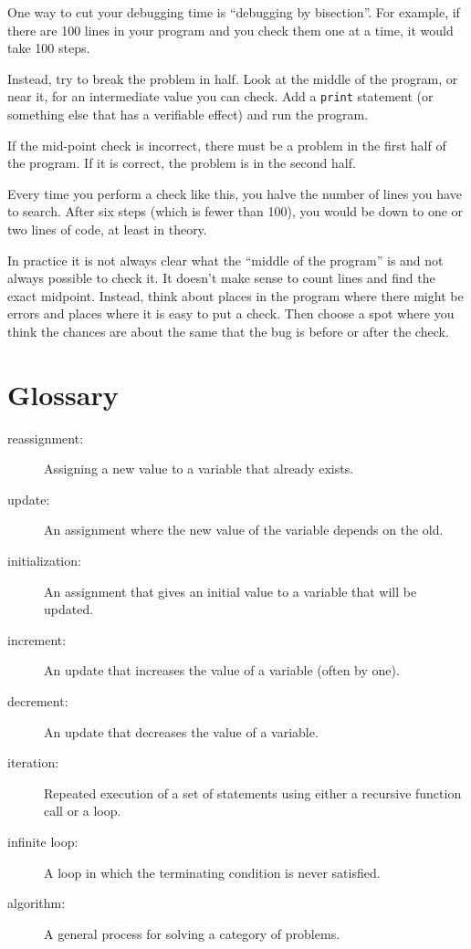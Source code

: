 \documentclass[10pt]{book}
\begin{document}
One way to cut your debugging time is ``debugging by bisection''.
For example, if there are 100 lines in your program and you
check them one at a time, it would take 100 steps.

Instead, try to break the problem in half.  Look at the middle
of the program, or near it, for an intermediate value you
can check.  Add a {\tt print} statement (or something else
that has a verifiable effect) and run the program.

If the mid-point check is incorrect, there must be a problem in the
first half of the program.  If it is correct, the problem is
in the second half.

Every time you perform a check like this, you halve the number of
lines you have to search.  After six steps (which is fewer than 100),
you would be down to one or two lines of code, at least in theory.

In practice it is not always clear what
the ``middle of the program'' is and not always possible to
check it.  It doesn't make sense to count lines and find the
exact midpoint.  Instead, think about places
in the program where there might be errors and places where it
is easy to put a check.  Then choose a spot where you
think the chances are about the same that the bug is before
or after the check.




\section{Glossary}

\begin{description}

\item[reassignment:] Assigning a new value to a variable that
already exists.

\item[update:] An assignment where the new value of the variable
depends on the old.

\item[initialization:] An assignment that gives an initial value to
a variable that will be updated.

\item[increment:] An update that increases the value of a variable
(often by one).

\item[decrement:] An update that decreases the value of a variable.

\item[iteration:] Repeated execution of a set of statements using
either a recursive function call or a loop.

\item[infinite loop:] A loop in which the terminating condition is
never satisfied.

\item[algorithm:]  A general process for solving a category of
problems.

\end{description}
\end{document}
